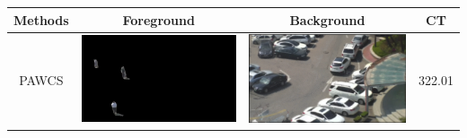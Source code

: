\documentclass[11pt]{hyu_thesis}
\begin{document}
\begin{table}\ContinuedFloat
	\centering
	\begin{tabular}{cccc}
		\hline\hline
		Methods & Foreground & Background & CT \\
		\hline\hline
		PAWCS & \parbox[c]{0.35\linewidth}{\includegraphics[width=\linewidth]{bgm-fg-PAWCS.png}} &
		\parbox[c]{0.35\linewidth}{\includegraphics[width=\linewidth]{bgm-bg-PAWCS.png}} & 322.01 \\
		\hline\hline

\end{tabular}
\end{table}
\end{document}
